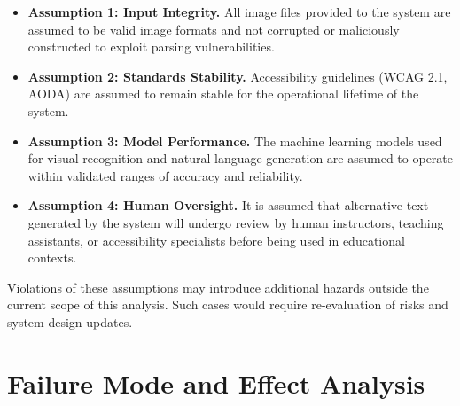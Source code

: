 \documentclass{article}
\begin{document}
\begin{itemize}
  \item \textbf{Assumption 1: Input Integrity.} All image files provided
    to the system are assumed to be valid image formats and not corrupted
    or maliciously constructed to exploit parsing vulnerabilities.

  \item \textbf{Assumption 2: Standards Stability.} Accessibility
    guidelines (WCAG 2.1, AODA) are assumed to remain stable for the
    operational lifetime of the system.

  \item \textbf{Assumption 3: Model Performance.} The machine learning
    models used for visual recognition and natural language generation are
    assumed to operate within validated ranges of accuracy and reliability.

  \item \textbf{Assumption 4: Human Oversight.} It is assumed that
    alternative text generated by the system will undergo review by human
    instructors, teaching assistants, or accessibility specialists before
    being used in educational contexts.
\end{itemize}

Violations of these assumptions may introduce additional hazards outside
the current scope of this analysis. Such cases would require
re-evaluation of risks and system design updates.

\section{Failure Mode and Effect Analysis}
\end{document}
